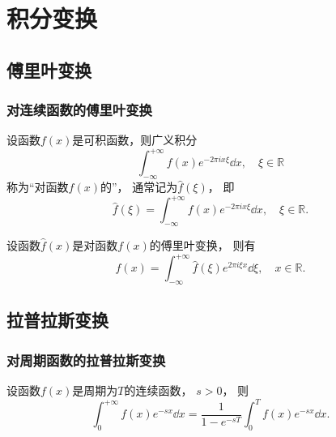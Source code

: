 \chapter{积分变换}
\section{傅里叶变换}
\subsection{对连续函数的傅里叶变换}
\begin{definition}
设函数\(f(x)\)是可积函数，则广义积分\[
	\int_{-\infty}^{+\infty}
	f(x) e^{-2 \pi i x \xi}
	\dd{x},
	\quad \xi \in \mathbb{R}
\]
称为“对函数\(f(x)\)的”，
通常记为\(\hat{f}(\xi)\)，
即\[
	\hat{f}(\xi)
	= \int_{-\infty}^{+\infty} f(x) e^{-2 \pi i x \xi} \dd{x},
	\quad \xi \in \mathbb{R}.
\]
\end{definition}

\begin{theorem}
设函数\(\hat{f}(x)\)是对函数\(f(x)\)的傅里叶变换，
则有\[
	f(x)
	= \int_{-\infty}^{+\infty}
	\hat{f}(\xi) e^{2 \pi i \xi x} \dd{\xi},
	\quad x \in \mathbb{R}.
\]
\end{theorem}

\section{拉普拉斯变换}
\subsection{对周期函数的拉普拉斯变换}
\begin{theorem}
设函数\(f(x)\)是周期为\(T\)的连续函数，
\(s>0\)，
则\[
	\int_0^{+\infty} f(x) e^{-sx} \dd{x}
	= \frac1{1-e^{-sT}}
	\int_0^T f(x) e^{-sx} \dd{x}.
\]
\end{theorem}
